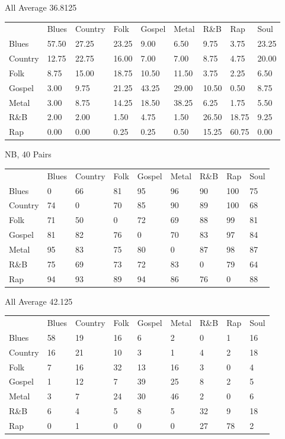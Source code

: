 \documentclass[a4paper,oneside]{article}
\begin{document}
All
Average 36.8125
\begin{table}
\begin{tabular}{|l||*{8}{l|}} \hline
&	Blues & Country & Folk & Gospel & Metal & R\&B & Rap & Soul \\ \hhline{|=||*{8}{=|}}
Blues & 57.50 & 27.25 & 23.25 & 9.00 & 6.50 & 9.75 & 3.75 & 23.25 \\ \hline
Country & 12.75 & 22.75 & 16.00 & 7.00 & 7.00 & 8.75 & 4.75 & 20.00 \\ \hline
Folk & 8.75 & 15.00 & 18.75 & 10.50 & 11.50 & 3.75 & 2.25 & 6.50 \\ \hline
Gospel & 3.00 & 9.75 & 21.25 & 43.25 & 29.00 & 10.50 & 0.50 & 8.75 \\ \hline
Metal & 3.00 & 8.75 & 14.25 & 18.50 & 38.25 & 6.25 & 1.75 & 5.50 \\ \hline
R\&B & 2.00 & 2.00 & 1.50 & 4.75 & 1.50 & 26.50 & 18.75 & 9.25 \\ \hline
Rap & 0.00 & 0.00 & 0.25 & 0.25 & 0.50 & 15.25 & 60.75 & 0.00 \\ \hline
\end{tabular}
\end{table}

NB, 40
Pairs
\begin{table}
\begin{tabular}{|l||*{8}{l|}} \hline
 & Blues & Country & Folk & Gospel & Metal & R\&B & Rap & Soul \\ \hhline{|=||*{8}{=|}}
Blues & 0 & 66 & 81 & 95 & 96 & 90 & 100 & 75 \\ \hline
Country & 74 & 0 & 70 & 85 & 90 & 89 & 100 & 68 \\ \hline
Folk & 71 & 50 & 0 & 72 & 69 & 88 & 99 & 81 \\ \hline
Gospel & 81 & 82 & 76 & 0 & 70 & 83 & 97 & 84 \\ \hline
Metal & 95 & 83 & 75 & 80 & 0 & 87 & 98 & 87 \\ \hline
R\&B & 75 & 69 & 73 & 72 & 83 & 0 & 79 & 64 \\ \hline
Rap & 94 & 93 & 89 & 94 & 86 & 76 & 0 & 88 \\ \hline
\end{tabular}
\end{table}

All
Average 42.125
\begin{table}
\begin{tabular}{|l||*{8}{l|}} \hline
 & Blues & Country & Folk & Gospel & Metal & R\&B & Rap & Soul \\ \hhline{|=||*{8}{=|}}
Blues & 58 & 19 & 16 & 6 & 2 & 0 & 1 & 16 \\ \hline
Country & 16 & 21 & 10 & 3 & 1 & 4 & 2 & 18 \\ \hline
Folk & 7 & 16 & 32 & 13 & 16 & 3 & 0 & 4 \\ \hline
Gospel & 1 & 12 & 7 & 39 & 25 & 8 & 2 & 5 \\ \hline
Metal & 3 & 7 & 24 & 30 & 46 & 2 & 0 & 6 \\ \hline
R\&B & 6 & 4 & 5 & 8 & 5 & 32 & 9 & 18 \\ \hline
Rap & 0 & 1 & 0 & 0 & 0 & 27 & 78 & 2 \\ \hline
\end{tabular}
\end{table}
\end{document}
